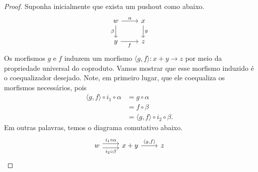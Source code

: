 \begin{proof}
    Suponha inicialmente que exista um pushout como abaixo.
    \begin{displaymath}
        \begin{tikzcd}
            w
            \arrow[r, "\alpha"]
            \arrow[d, "\beta" swap]
            & x
            \arrow[d, "g"]
            \\ y
            \arrow[r, "f" swap]
            & z
        \end{tikzcd}
    \end{displaymath}
    Os morfismos $g$ e $f$ induzem um morfismo $\langle g,f \rangle: x +y \to z$ por meio da propriedade universal do coproduto.
    Vamos mostrar que esse morfismo induzido é o coequalizador desejado.
    Note, em primeiro lugar, que ele coequaliza os morfismos necessários, pois
    \begin{align*}
        \langle g,f \rangle \circ i_1 \circ \alpha
        & = g \circ \alpha \\
        & = f \circ \beta \\
        & = \langle g,f \rangle \circ i_2 \circ \beta.
    \end{align*}
    Em outras palavras, temos o diagrama comutativo abaixo.
    \begin{displaymath}
        \begin{tikzcd}
            w
            \arrow[r, shift left=1.25, "i_1 \circ \alpha"]
            \arrow[r, shift right=1.25, "i_2 \circ \beta" swap]
            & x+y
            \arrow[r, "{\langle g,f \rangle}"]
            & z
        \end{tikzcd}
    \end{displaymath}


\end{proof}
